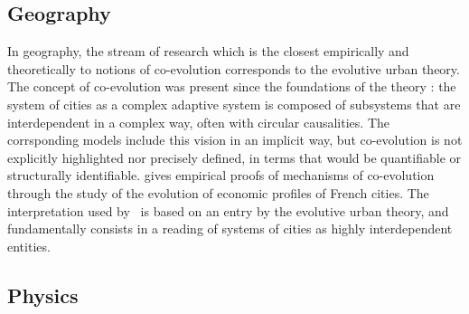 \documentclass[letterpaper]{article}
\begin{document}
\subsection{Geography}

In geography, the stream of research which is the closest empirically and theoretically to notions of co-evolution corresponds to the evolutive urban theory. The concept of co-evolution was present since the foundations of the theory \citep{pumain1997pour}: the system of cities as a complex adaptive system is composed of subsystems that are interdependent in a complex way, often with circular causalities. The corrsponding models include this vision in an implicit way, but co-evolution is not explicitly highlighted nor precisely defined, in terms that would be quantifiable or structurally identifiable. \cite{paulus2004coevolution} gives empirical proofs of mechanisms of co-evolution through the study of the evolution of economic profiles of French cities. The interpretation used by~\cite{schmitt2014modelisation} is based on an entry by the evolutive urban theory, and fundamentally consists in a reading of systems of cities as highly interdependent entities.



\subsection{Physics}
\end{document}
